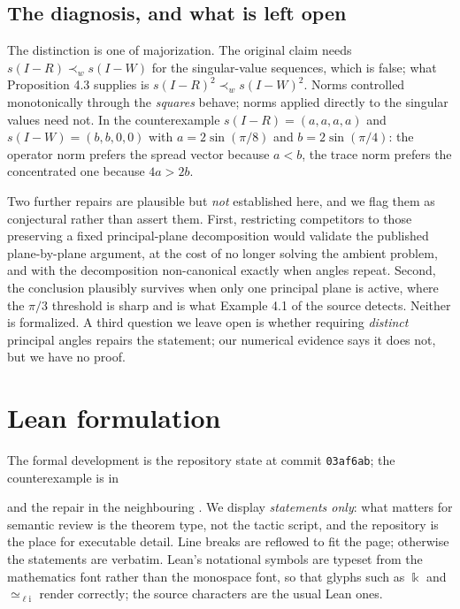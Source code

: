 \documentclass[11pt]{article}
\theoremstyle{definition}
\begin{document}
\subsection{The diagnosis, and what is left open}

The distinction is one of majorization.  The original claim needs
$s(I-R)\prec_w s(I-W)$ for the singular-value sequences, which is false; what
Proposition 4.3 supplies is $s(I-R)^2\prec_w s(I-W)^2$.  Norms controlled
monotonically through the \emph{squares} behave; norms applied directly to the
singular values need not.  In the counterexample
$s(I-R)=(a,a,a,a)$ and $s(I-W)=(b,b,0,0)$ with $a=2\sin(\pi/8)$ and
$b=2\sin(\pi/4)$: the operator norm prefers the spread vector because $a<b$,
the trace norm prefers the concentrated one because $4a>2b$.

Two further repairs are plausible but \emph{not} established here, and we flag
them as conjectural rather than assert them.  First, restricting competitors to
those preserving a fixed principal-plane decomposition would validate the
published plane-by-plane argument, at the cost of no longer solving the ambient
problem, and with the decomposition non-canonical exactly when angles repeat.
Second, the conclusion plausibly survives when only one principal plane is
active, where the $\pi/3$ threshold is sharp and is what Example 4.1 of the
source detects.  Neither is formalized.  A third question we leave open is
whether requiring \emph{distinct} principal angles repairs the statement; our
numerical evidence says it does not, but we have no proof.

\section{Lean formulation}
\label{sec:lean}

The formal development is the repository state at commit \texttt{03af6ab}; the
counterexample is in
\begin{center}
\small{}
\end{center}
and the repair in the neighbouring .  We display
\emph{statements only}: what matters for semantic review is the theorem type,
not the tactic script, and the repository is the place for executable detail.
Line breaks are reflowed to fit the page; otherwise the statements are
verbatim.  Lean's notational symbols are typeset from the mathematics font
rather than the monospace font, so that glyphs such as $\Bbbk$ and
$\simeq_{\ell\mathrm{i}}$ render correctly; the source characters are the usual
Lean ones.
\end{document}
